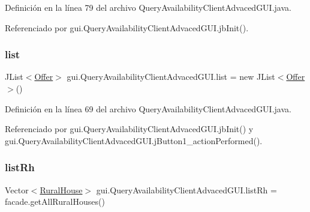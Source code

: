 Definición en la línea 79 del archivo Query\+Availability\+Client\+Advaced\+G\+U\+I.\+java.



Referenciado por gui.\+Query\+Availability\+Client\+Advaced\+G\+U\+I.\+jb\+Init().

\mbox{\label{classgui_1_1_query_availability_client_advaced_g_u_i_a1b0029e151744408698185103431652e}} 
\subsubsection{\texorpdfstring{list}{list}}
{\footnotesize\ttfamily J\+List$<$\mbox{\hyperlink{classdomain_1_1_offer}{Offer}}$>$ gui.\+Query\+Availability\+Client\+Advaced\+G\+U\+I.\+list = new J\+List$<$\mbox{\hyperlink{classdomain_1_1_offer}{Offer}}$>$()\hspace{0.3cm}{\ttfamily [private]}}



Definición en la línea 69 del archivo Query\+Availability\+Client\+Advaced\+G\+U\+I.\+java.



Referenciado por gui.\+Query\+Availability\+Client\+Advaced\+G\+U\+I.\+jb\+Init() y gui.\+Query\+Availability\+Client\+Advaced\+G\+U\+I.\+j\+Button1\+\_\+action\+Performed().

\mbox{\label{classgui_1_1_query_availability_client_advaced_g_u_i_ad7253f53e611e8e9eb49d69eda34c3dc}} 
\subsubsection{\texorpdfstring{listRh}{listRh}}
{\footnotesize\ttfamily Vector$<$\mbox{\hyperlink{classdomain_1_1_rural_house}{Rural\+House}}$>$ gui.\+Query\+Availability\+Client\+Advaced\+G\+U\+I.\+list\+Rh = facade.\+get\+All\+Rural\+Houses()\hspace{0.3cm}{\ttfamily [private]}}



